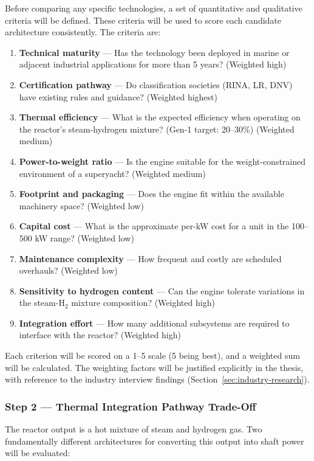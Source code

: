 \documentclass[12pt]{article}
\begin{document}
Before comparing any specific technologies, a set of quantitative and qualitative criteria will be defined. These criteria will be used to score each candidate architecture consistently. The criteria are:

\begin{enumerate}[label=\arabic*.]
    \item \textbf{Technical maturity} — Has the technology been deployed in marine or adjacent industrial applications for more than 5 years? (Weighted high)
    \item \textbf{Certification pathway} — Do classification societies (RINA, LR, DNV) have existing rules and guidance? (Weighted highest)
    \item \textbf{Thermal efficiency} — What is the expected efficiency when operating on the reactor's steam-hydrogen mixture? (Gen-1 target: 20–30\%) (Weighted medium)
    \item \textbf{Power-to-weight ratio} — Is the engine suitable for the weight-constrained environment of a superyacht? (Weighted medium)
    \item \textbf{Footprint and packaging} — Does the engine fit within the available machinery space? (Weighted low)
    \item \textbf{Capital cost} — What is the approximate per-kW cost for a unit in the 100–500 kW range? (Weighted low)
    \item \textbf{Maintenance complexity} — How frequent and costly are scheduled overhauls? (Weighted low)
    \item \textbf{Sensitivity to hydrogen content} — Can the engine tolerate variations in the steam-H$_2$ mixture composition? (Weighted high)
    \item \textbf{Integration effort} — How many additional subsystems are required to interface with the reactor? (Weighted high)
\end{enumerate}

Each criterion will be scored on a 1–5 scale (5 being best), and a weighted sum will be calculated. The weighting factors will be justified explicitly in the thesis, with reference to the industry interview findings (Section~\ref{sec:industry-research}).

\subsubsection*{Step 2 — Thermal Integration Pathway Trade-Off}

The reactor output is a hot mixture of steam and hydrogen gas. Two fundamentally different architectures for converting this output into shaft power will be evaluated:
\end{document}
